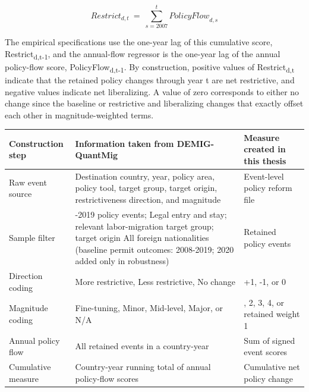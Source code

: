 \documentclass[11pt,a4paper]{article}
\newcounter{none}
\begin{document}
\[{Restrict}_{d,t}\  = \ \sum_{s = 2007}^{t}{PolicyFlow}_{d,s}\]

The empirical specifications use the one-year lag of this cumulative
score, Restrict\textsubscript{d,t-1}, and the annual-flow regressor is
the one-year lag of the annual policy-flow score,
PolicyFlow\textsubscript{d,t-1}. By construction, positive values of
Restrict\textsubscript{d,t} indicate that the retained policy changes
through year t are net restrictive, and negative values indicate net
liberalizing. A value of zero corresponds to either no change since the
baseline or restrictive and liberalizing changes that exactly offset
each other in magnitude-weighted terms.

\par{}
\noindent\begin{minipage}{\linewidth}
\label{tab:construction}
\end{minipage}
{\footnotesize\setlength{\tabcolsep}{3.0pt}\renewcommand{\arraystretch}{1.12} %
\begin{longtable}[]{@{}
  >{\raggedright\arraybackslash}p{}
  >{\raggedright\arraybackslash}p{}
  >{\raggedright\arraybackslash}p{}@{}}
\toprule\noalign{}
\begin{minipage}[b]{\linewidth}\raggedright
\textbf{Construction step}
\end{minipage} & \begin{minipage}[b]{\linewidth}\raggedright
\textbf{Information taken from DEMIG-QuantMig}
\end{minipage} & \begin{minipage}[b]{\linewidth}\raggedright
\textbf{Measure created in this thesis}
\end{minipage} \\
\midrule\noalign{}
\endhead
\bottomrule\noalign{}
\endlastfoot
Raw event source & Destination country, year, policy area, policy tool,
target group, target origin, restrictiveness direction, and magnitude &
Event-level policy reform file \\
Sample filter & 2007-2019 policy events; Legal entry and stay; relevant
labor-migration target group; target origin All foreign nationalities
(baseline permit outcomes: 2008-2019; 2020 added only in robustness) &
Retained policy events \\
Direction coding & More restrictive, Less restrictive, No change & +1,
-1, or 0 \\
Magnitude coding & Fine-tuning, Minor, Mid-level, Major, or N/A & 1, 2,
3, 4, or retained weight 1 \\
Annual policy flow & All retained events in a country-year & Sum of
signed event scores \\
Cumulative measure & Country-year running total of annual policy-flow
scores & Cumulative net policy change \\
\end{longtable}
}
\end{document}
